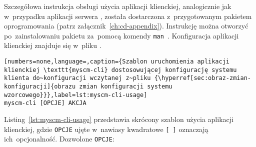 \documentclass[thesis]{subfiles}
\begin{document}
Szczegółowa instrukcja obsługi użycia aplikacji klienckiej, analogicznie jak w~przypadku aplikacji serwera \texttt{\srvappname}, została dostarczona z~przygotowanym pakietem oprogramowania \texttt{\cliappname{}} (patrz załącznik~\ref{ch:cd-appendix}). Instrukcję można otworzyć po~zainstalowaniu pakietu \texttt{\cliappname{}} za~pomocą komendy \texttt{man~\cliappname{}}. Konfiguracja aplikacji klienckiej znajduje się w~pliku \myscmcliconfig{}.

\begin{lstlisting}[numbers=none,language=,caption={Szablon uruchomienia aplikacji klienckiej \texttt{myscm-cli} dostosowującej konfigurację systemu klienta do~konfiguracji wczytanej z~pliku {\hyperref[sec:obraz-zmian-konfiguracji]{obrazu zmian konfiguracji systemu wzorcowego}}},label=lst:myscm-cli-usage]
myscm-cli [OPCJE] AKCJA
\end{lstlisting}

Listing~\ref{lst:myscm-cli-usage} przedstawia skrócony szablon użycia aplikacji klienckiej, gdzie \texttt{OPCJE} ujęte w~nawiasy kwadratowe \texttt{[~]} oznaczają ich~opcjonalność. Dozwolone \texttt{OPCJE}:\mynobreakpar
\end{document}
